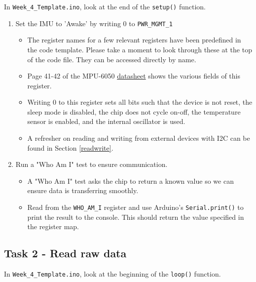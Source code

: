 \documentclass{article}
\begin{document}
        In \texttt{Week\_4\_Template.ino}, look at the end of the \texttt{setup()} function.

        \begin{enumerate}
            \item Set the IMU to 'Awake' by writing 0 to \texttt{PWR\_MGMT\_1}
            \begin{itemize}
                \item The register names for a few relevant registers have been predefined in the code template. Please take a moment to look through these at the top of the code file. They can be accessed directly by name.
                \item Page 41-42 of the MPU-6050 \href{https://cdn.sparkfun.com/datasheets/Sensors/Accelerometers/RM-MPU-6000A.pdf}{datasheet} shows the various fields of this register.
                \item Writing 0 to this register sets all bits such that the device is not reset, the sleep mode is disabled, the chip does not cycle on-off, the temperature sensor is enabled, and the internal oscillator is used.
                \item A refresher on reading and writing from external devices with I2C can be found in Section \ref{readwrite}.
            \end{itemize}
            \item Run a "Who Am I" test to ensure communication.
            \begin{itemize}
                \item A "Who Am I" test asks the chip to return a known value so we can ensure data is transferring smoothly.
                \item Read from the \texttt{WHO\_AM\_I} register and use Arduino's \texttt{Serial.print()} to print the result to the console. This should return the value specified in the register map. 
            \end{itemize}
        \end{enumerate}

    \subsection{Task 2 - Read raw data}\label{Sec2}
    
        In \texttt{Week\_4\_Template.ino}, look at the beginning of the \texttt{loop()} function.
    
\end{document}
